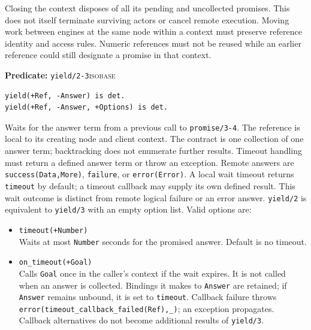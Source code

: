 Closing the context disposes of all its pending and uncollected promises.
This does not itself terminate surviving actors or cancel remote execution.
Moving work between engines at the same node within a context must preserve reference identity
and access rules. Numeric references must not be reused while an earlier
reference could still designate a promise in that context.

\noindent \textbf{Predicate:} \texttt{yield/\allowbreak{}2-3}\hfill\textsc{isobase}

\begin{verbatim}
yield(+Ref, -Answer) is det.
yield(+Ref, -Answer, +Options) is det.
\end{verbatim}

\noindent Waits for the answer term from a previous call to
\texttt{promise/\allowbreak{}3-4}. The reference is local to its creating
node and client context. The contract is one collection of one answer term; backtracking
does not enumerate further results. Timeout handling must return a defined
answer term or throw an exception.
Remote answers are \texttt{success(\allowbreak{}Data,\allowbreak{}More)}, \texttt{failure}, or
\texttt{error(\allowbreak{}Error)}. A local wait timeout returns \texttt{timeout} by
default; a timeout callback may supply its own defined result. This wait
outcome is distinct from remote logical failure or an error answer.
\texttt{yield/\allowbreak{}2} is equivalent to \texttt{yield/\allowbreak{}3} with an empty option list.
Valid options
are:

\begin{itemize}
\item
  \texttt{timeout(\allowbreak{}+Number)}\\
  Waits at most \texttt{Number} seconds for the promised answer. Default is no
  timeout.
\item
  \texttt{on\_\allowbreak{}timeout(\allowbreak{}+Goal)}\\
  Calls \texttt{Goal} once in the caller's context if the wait expires.
  It is not called when an answer is collected.
  Bindings it makes to \texttt{Answer} are retained; if \texttt{Answer}
  remains unbound, it is set to \texttt{timeout}. Callback failure throws
  \texttt{error(\allowbreak{}timeout\_\allowbreak{}callback\_\allowbreak{}failed(\allowbreak{}Ref),\allowbreak{}\_\allowbreak{})}; an exception propagates.
  Callback alternatives do not become additional results of \texttt{yield/\allowbreak{}3}.
\end{itemize}

